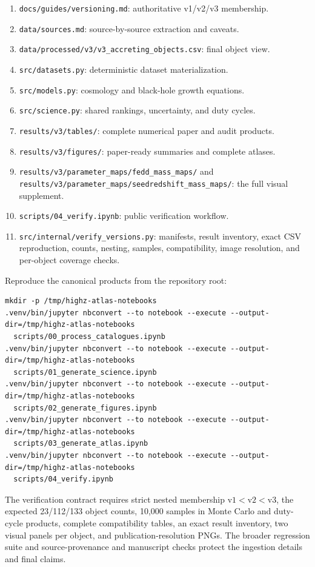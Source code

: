 \documentclass[10.5pt]{article}
\newcommand{\repo}[1]{{\footnotesize\texttt{#1}}}
\begin{document}
\begin{enumerate}[leftmargin=1.5em,itemsep=3pt]
  \item \repo{docs/guides/versioning.md}: authoritative v1/v2/v3 membership.
  \item \repo{data/sources.md}: source-by-source extraction and caveats.
  \item \repo{data/processed/v3/v3\_accreting\_objects.csv}: final object view.
  \item \repo{src/datasets.py}: deterministic dataset materialization.
  \item \repo{src/models.py}: cosmology and black-hole growth equations.
  \item \repo{src/science.py}: shared rankings, uncertainty, and duty cycles.
  \item \repo{results/v3/tables/}: complete numerical paper and audit products.
  \item \repo{results/v3/figures/}: paper-ready summaries and complete atlases.
  \item \repo{results/v3/parameter\_maps/fedd\_mass\_maps/} and
  \repo{results/v3/parameter\_maps/seedredshift\_mass\_maps/}: the full visual supplement.
  \item \repo{scripts/04\_verify.ipynb}: public verification workflow.
  \item \repo{src/internal/verify\_versions.py}: manifests, result inventory,
  exact CSV reproduction, counts, nesting, samples, compatibility, image
  resolution, and per-object coverage checks.
\end{enumerate}

Reproduce the canonical products from the repository root:

\begin{verbatim}
mkdir -p /tmp/highz-atlas-notebooks
.venv/bin/jupyter nbconvert --to notebook --execute --output-dir=/tmp/highz-atlas-notebooks
  scripts/00_process_catalogues.ipynb
.venv/bin/jupyter nbconvert --to notebook --execute --output-dir=/tmp/highz-atlas-notebooks
  scripts/01_generate_science.ipynb
.venv/bin/jupyter nbconvert --to notebook --execute --output-dir=/tmp/highz-atlas-notebooks
  scripts/02_generate_figures.ipynb
.venv/bin/jupyter nbconvert --to notebook --execute --output-dir=/tmp/highz-atlas-notebooks
  scripts/03_generate_atlas.ipynb
.venv/bin/jupyter nbconvert --to notebook --execute --output-dir=/tmp/highz-atlas-notebooks
  scripts/04_verify.ipynb
\end{verbatim}

The verification contract requires strict nested membership
$\mathrm{v1}<\mathrm{v2}<\mathrm{v3}$, the expected 23/112/133 object counts,
10,000 samples in Monte Carlo and duty-cycle products, complete compatibility
tables, an exact result inventory, two visual panels per object, and
publication-resolution PNGs. The
broader regression suite and source-provenance and manuscript checks protect
the ingestion details and final claims.
\end{document}
